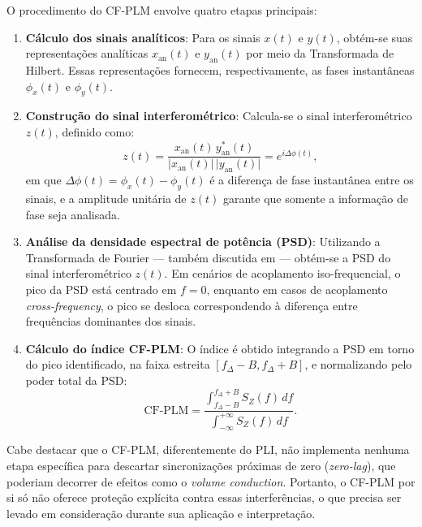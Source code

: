 O procedimento do CF-PLM envolve quatro etapas principais:

\begin{enumerate}
    \item \textbf{Cálculo dos sinais analíticos}: Para os sinais \(x(t)\) e \(y(t)\), obtém-se suas representações analíticas \(x_{\mathrm{an}}(t)\) e \(y_{\mathrm{an}}(t)\) por meio da Transformada de Hilbert. Essas representações fornecem, respectivamente, as fases instantâneas \(\phi_x(t)\) e \(\phi_y(t)\).

    \item \textbf{Construção do sinal interferométrico}: Calcula-se o sinal interferométrico \(z(t)\), definido como:
    \[
    z(t) = \frac{x_{\mathrm{an}}(t)\, y_{\mathrm{an}}^*(t)}{\lvert x_{\mathrm{an}}(t)\rvert\, \lvert y_{\mathrm{an}}(t)\rvert} = e^{i\Delta \phi(t)},
    \]
    em que \(\Delta \phi(t) = \phi_x(t) - \phi_y(t)\) é a diferença de fase instantânea entre os sinais, e a amplitude unitária de \(z(t)\) garante que somente a informação de fase seja analisada.

    \item \textbf{Análise da densidade espectral de potência (PSD)}: Utilizando a Transformada de Fourier — também discutida em \cite{seraj2018cerebral} — obtém-se a PSD do sinal interferométrico \(z(t)\). Em cenários de acoplamento iso-frequencial, o pico da PSD está centrado em \(f = 0\), enquanto em casos de acoplamento \textit{cross-frequency}, o pico se desloca correspondendo à diferença entre frequências dominantes dos sinais.

    \item \textbf{Cálculo do índice CF-PLM}: O índice é obtido integrando a PSD em torno do pico identificado, na faixa estreita \([f_\Delta - B, f_\Delta + B]\), e normalizando pelo poder total da PSD:
    \[
    \text{CF-PLM} = \frac{\displaystyle\int_{f_\Delta - B}^{f_\Delta + B} S_Z(f) \, df}{\displaystyle\int_{-\infty}^{+\infty} S_Z(f) \, df}.
    \]
\end{enumerate}

Cabe destacar que o CF-PLM, diferentemente do PLI, não implementa nenhuma etapa específica para descartar sincronizações próximas de zero (\textit{zero-lag}), que poderiam decorrer de efeitos como o \textit{volume conduction}. Portanto, o CF-PLM por si só não oferece proteção explícita contra essas interferências, o que precisa ser levado em consideração durante sua aplicação e interpretação.

